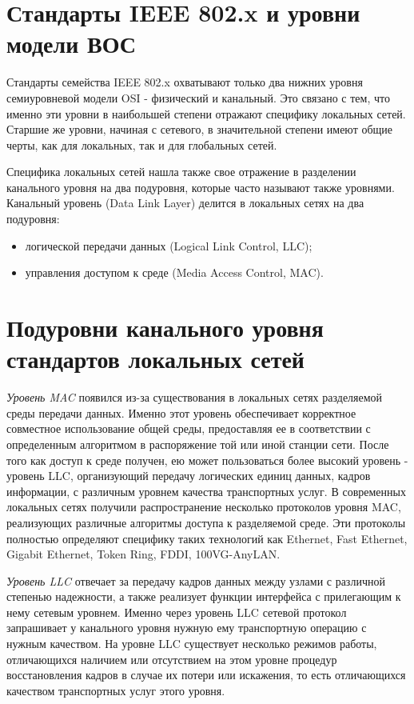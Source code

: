 \section{Стандарты IEEE 802.x и уровни модели ВОС}

Стандарты семейства IEEE 802.x охватывают только два нижних уровня семиуровневой модели OSI - физический и канальный.
Это связано с тем, что именно эти уровни в наибольшей степени отражают специфику локальных сетей.
Старшие же уровни, начиная с сетевого, в значительной степени имеют общие черты, как для локальных, так и для глобальных сетей.

Специфика локальных сетей нашла также свое отражение в разделении канального уровня на два подуровня, которые часто называют также уровнями.
Канальный уровень (Data Link Layer) делится в локальных сетях на два подуровня:
\begin{itemize}
    \item логической передачи данных (Logical Link Control, LLC);
    \item управления доступом к среде (Media Access Control, MAC).
\end{itemize}

\section{Подуровни канального уровня стандартов локальных сетей}

\emph{Уровень MAC} появился из-за существования в локальных сетях разделяемой среды передачи данных.
Именно этот уровень обеспечивает корректное совместное использование общей среды, предоставляя ее в соответствии с определенным алгоритмом в распоряжение той или иной станции сети.
После того как доступ к среде получен, ею может пользоваться более высокий уровень - уровень LLC, организующий передачу логических единиц данных, кадров информации, с различным уровнем качества транспортных услуг.
В современных локальных сетях получили распространение несколько протоколов уровня MAC, реализующих различные алгоритмы доступа к разделяемой среде.
Эти протоколы полностью определяют специфику таких технологий как Ethernet, Fast Ethernet, Gigabit Ethernet, Token Ring, FDDI, 100VG-AnyLAN.

\emph{Уровень LLC} отвечает за передачу кадров данных между узлами с различной степенью надежности, а также реализует функции интерфейса с прилегающим к нему сетевым уровнем.
Именно через уровень LLC сетевой протокол запрашивает у канального уровня нужную ему транспортную операцию с нужным качеством.
 На уровне LLC существует несколько режимов работы, отличающихся наличием или отсутствием на этом уровне процедур восстановления кадров в случае их потери или искажения, то есть отличающихся качеством транспортных услуг этого уровня.

